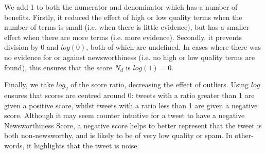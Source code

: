 We add 1 to both the numerator and denominator which has a number of benefits.
Firstly, it reduced the effect of high or low quality terms when the number of terms is small (i.e. when there is little evidence), but has a smaller effect when there are more terms (i.e. more evidence).
Secondly, it prevents division by 0 and \(log(0)\), both of which are undefined.
In cases where there was no evidence for or against newsworthiness (i.e. no high or low quality terms are found), this ensures that the score \(N_d\) is \(log(1) = 0 \).

Finally, we take \(log_2\) of the score ratio, decreasing the effect of outliers.
Using \(log\) ensures that scores are centred around 0: tweets with a ratio greater than 1 are given a positive score, whilst tweets with a ratio less than 1 are given a negative score.
Although it may seem counter intuitive for a tweet to have a negative Newsworthiness Score, a negative score helps to better represent that the tweet is both non-newsworthy, and is likely to be of very low quality or spam. In other-words, it highlights that the tweet is noise.
